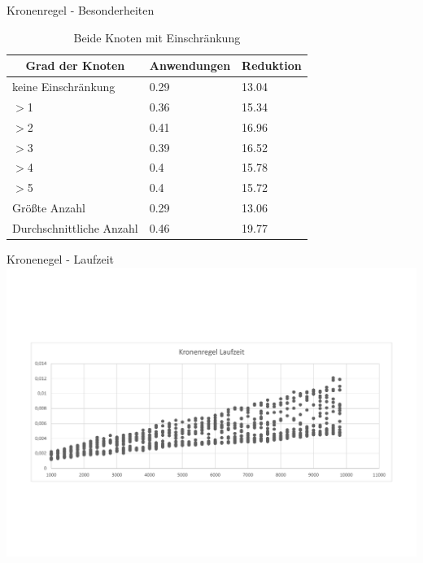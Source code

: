 \documentclass{beamer}
\begin{document}
\begin{frame}{Kronenregel - Besonderheiten}
\begin{table}[htb]
\caption{Beide Knoten mit Einschränkung\label{tab:degreeAND}}
\vspace*{1em}
\centering

\bgroup
\def\arraystretch{1.3}%

\begin{tabular}[c]{l|l|l}
	
	\multicolumn{1}{c|}{\textbf{Grad der Knoten}} & 
	\multicolumn{1}{c|}{\textbf{Anwendungen}} & 
	\multicolumn{1}{c}{\textbf{Reduktion}} \\ 
	
	\hline

	keine Einschränkung&0.29&13.04\\
	$>$1&0.36 &15.34 \\
	$>$2&0.41 &16.96 \\
	$>$3& 0.39& 16.52 \\
	$>$4& 0.4 &15.78 \\
	$>$5& 0.4 & 15.72\\  
	Größte Anzahl& 0.29 &13.06 \\
	Durchschnittliche Anzahl& 0.46&19.77 \\
	
\end{tabular}
\egroup

\end{table}
\end{frame}

\begin{frame}{Kronenegel - Laufzeit}
\includegraphics[scale= .4]{analysis1000_CrownNormal_runtime.pdf} 
\end{frame}
\end{document}
